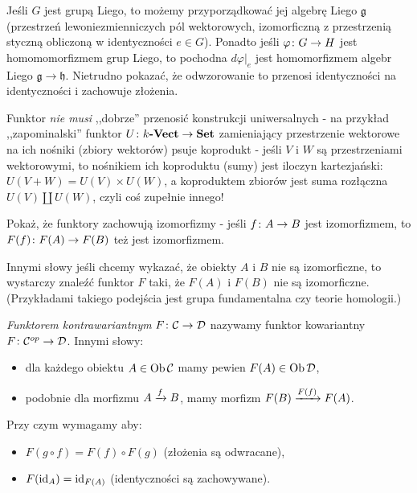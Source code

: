 \begin{exmp}
  Jeśli $G$ jest grupą Liego, to możemy przyporządkować jej algebrę Liego $\mathfrak g$ (przestrzeń lewoniezmienniczych pól wektorowych, izomorficzną z przestrzenią styczną obliczoną w identyczności $e\in G$). Ponadto jeśli $\morph \varphi GH$ jest homomomorfizmem grup Liego, to pochodna $d\varphi|_e$ jest homomorfizmem algebr Liego $\mathfrak g\to \mathfrak h$. Nietrudno pokazać, że odwzorowanie to przenosi identyczności na identyczności i zachowuje złożenia.
\end{exmp}

\begin{remk}
  Funktor \emph{nie musi} ,,dobrze'' przenosić konstrukcji uniwersalnych - na przykład ,,zapominalski'' funktor $\morph U{\Vect k} \Set$ zamieniający przestrzenie wektorowe na ich nośniki (zbiory wektorów) psuje koprodukt - jeśli $V$ i $W$ są przestrzeniami wektorowymi, to nośnikiem ich koproduktu (sumy) jest iloczyn kartezjański: $U(V+W) = U(V)\times U(W)$, a koproduktem zbiorów jest suma rozłączna $U(V)\coprod U(W)$, czyli coś zupełnie innego!
\end{remk}

\begin{exc}
  \label{exc:izo_preserved}
  Pokaż, że funktory zachowują izomorfizmy - jeśli $\morph fAB$ jest izomorfizmem, to $\morph {F(f)}{F(A)}{F(B)}$ też jest izomorfizmem.

  Innymi słowy jeśli chcemy wykazać, że obiekty $A$ i $B$ nie są izomorficzne, to wystarczy znaleźć funktor $F$ taki, że $F(A)$ i $F(B)$ nie są izomorficzne. (Przykładami takiego podejścia jest grupa fundamentalna czy teorie homologii.)
\end{exc}

\begin{defn}
  \emph{Funktorem kontrawariantnym} $\morph F\C\D$ nazywamy funktor kowariantny $\morph F {\op \C}{\D}$. Innymi słowy:
  \begin{itemize}
    \item dla każdego obiektu $A\in \Ob\C$ mamy pewien $F(A)\in \Ob\D$,
    \item podobnie dla morfizmu $\morpharr fAB$, mamy morfizm $\morpharr {F(f)}{F(B)}{F(A)}$.
  \end{itemize}
 Przy czym wymagamy aby:
  \begin{itemize}
    \item $F(g\circ f) = F(f)\circ F(g)$ (złożenia są odwracane),
    \item $F(\id A) = \id{F(A)}$ (identyczności są zachowywane).
  \end{itemize}
\end{defn}

